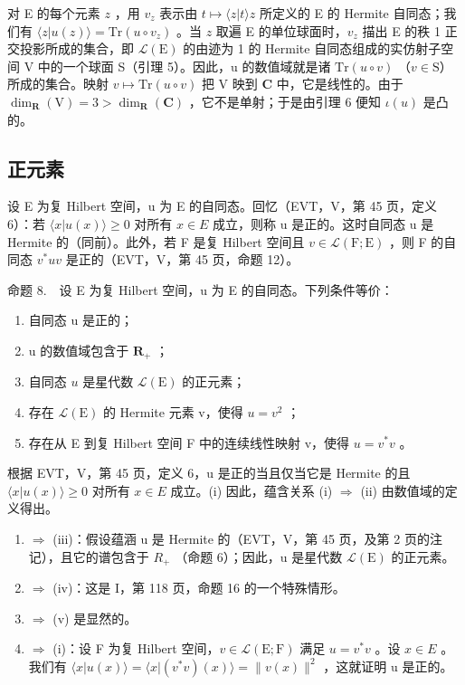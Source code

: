 对 E 的每个元素 \(z\) ，用 \(v_{z}\) 表示由 \(t \mapsto \langle z|t\rangle z\) 所定义的 E 的 Hermite 自同态；我们有 \(\langle z|u(z)\rangle = \mathrm{Tr}(u \circ v_{z})\) 。当 \(z\) 取遍 E 的单位球面时，\(v_{z}\) 描出 E 的秩 1 正交投影所成的集合，即 \(\mathcal{L}(\mathrm{E})\) 的由迹为 1 的 Hermite 自同态组成的实仿射子空间 V 中的一个球面 S（引理 5）。因此，u 的数值域就是诸 \(\mathrm{Tr}(u \circ v)\) （\(v \in \mathrm{S}\)）所成的集合。映射 \(v \mapsto \mathrm{Tr}(u \circ v)\) 把 V 映到 \(\mathbf{C}\) 中，它是线性的。由于 \(\dim_{\mathbf{R}}(\mathrm{V}) = 3 > \dim_{\mathbf{R}}(\mathbf{C})\) ，它不是单射；于是由引理 6 便知 \(\iota(u)\) 是凸的。

\subsection{正元素}

设 E 为复 Hilbert 空间，u 为 E 的自同态。回忆（EVT，V，第 45 页，定义 6）：若 \(\langle x|u(x)\rangle\geqslant0\) 对所有 \(x\in E\) 成立，则称 u 是正的。这时自同态 u 是 Hermite 的（同前）。此外，若 F 是复 Hilbert 空间且 \(v\in\mathcal{L}(\mathrm{F};\mathrm{E})\) ，则 F 的自同态 \(v^{*}uv\) 是正的（EVT，V，第 45 页，命题 12）。

命题 8.　设 E 为复 Hilbert 空间，u 为 E 的自同态。下列条件等价：

\begin{enumerate}
\def\labelenumi{(\roman{enumi})}
\item
  自同态 u 是正的；
\item
  u 的数值域包含于 \(\mathbf{R}_{+}\) ；
\item
  自同态 \(u\) 是星代数 \(\mathcal{L}(\mathrm{E})\) 的正元素；
\item
  存在 \(\mathcal{L}(\mathrm{E})\) 的 Hermite 元素 v，使得 \(u = v^2\) ；
\item
  存在从 E 到复 Hilbert 空间 F 中的连续线性映射 v，使得 \(u = v^{*}v\) 。
\end{enumerate}

根据 EVT，V，第 45 页，定义 6，u 是正的当且仅当它是 Hermite 的且 \(\langle x|u(x)\rangle\geqslant0\) 对所有 \(x\in E\) 成立。(i) 因此，蕴含关系 (i) \(\Longrightarrow\) (ii) 由数值域的定义得出。

\begin{enumerate}
\def\labelenumi{(\roman{enumi})}
\setcounter{enumi}{1}
\item
  \(\Longrightarrow\) (iii)：假设蕴涵 u 是 Hermite 的（EVT，V，第 45 页，及第 2 页的注记），且它的谱包含于 \(R_{+}\) （命题 6）；因此，u 是星代数 \(\mathcal{L}(\mathrm{E})\) 的正元素。
\item
  \(\Longrightarrow\) (iv)：这是 I，第 118 页，命题 16 的一个特殊情形。
\item
  \(\Longrightarrow\) (v) 是显然的。
\item
  \(\Longrightarrow\) (i)：设 F 为复 Hilbert 空间，\(v \in \mathcal{L}(\mathrm{E};\mathrm{F})\) 满足 \(u = v^{*}v\) 。设 \(x \in E\) 。我们有 \(\langle x|u(x)\rangle = \langle x|(v^{*}v)(x)\rangle = \|v(x)\|^{2}\) ，这就证明 u 是正的。
\end{enumerate}


